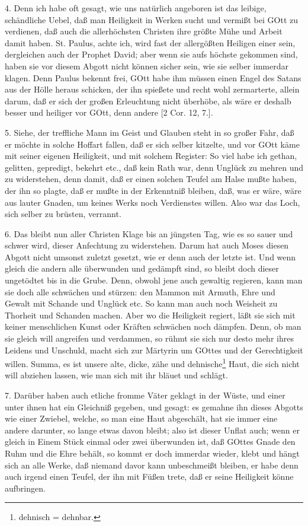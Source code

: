 4. Denn ich habe oft gesagt, wie uns natürlich angeboren ist das leibige, schändliche Uebel, daß man Heiligkeit in Werken sucht und vermißt bei GOtt zu verdienen, daß auch die allerhöchsten Christen ihre größte Mühe und Arbeit damit haben. St. Paulus, achte ich, wird fast der allergößten Heiligen einer sein, dergleichen auch der Prophet David; aber wenn sie aufs höchste gekommen sind, haben sie vor diesem Abgott nicht können sicher sein, wie sie selber immerdar klagen. Denn Paulus bekennt frei, GOtt habe ihm müssen einen Engel des Satans aus der Hölle heraus schicken, der ihn spießete und recht wohl zermarterte, allein darum, daß er sich der großen Erleuchtung nicht überhöbe, als wäre er deshalb besser und heiliger vor GOtt, denn andere [2 Cor. 12, 7.].

5. Siehe, der treffliche Mann im Geist und Glauben steht in so großer Fahr, daß er möchte in solche Hoffart fallen, daß er sich selber kitzelte, und vor GOtt käme mit seiner eigenen Heiligkeit, und mit solchem Register: So viel habe ich gethan, gelitten, gepredigt, bekehrt etc., daß kein Rath war, denn Unglück zu mehren und zu widerstehen, denn damit, daß er einen solchen Teufel am Halse mußte haben, der ihn so plagte, daß er mußte in der Erkenntniß bleiben, daß, was er wäre, wäre aus lauter Gnaden, um keines Werks noch Verdienstes willen. Also war das Loch, sich selber zu brüsten, verrannt.

6. Das bleibt nun aller Christen Klage bis an jüngsten Tag, wie es so sauer und schwer wird, dieser Anfechtung zu widerstehen. Darum hat auch Moses diesen Abgott nicht umsonst zuletzt gesetzt, wie er denn auch der letzte ist. Und wenn gleich die andern alle überwunden und gedämpft sind, so bleibt doch dieser ungetödtet bis in die Grube. Denn, obwohl jene auch gewaltig regieren, kann man sie doch alle schwächen und stürzen: den Mammon mit Armuth, Ehre und Gewalt mit Schande und Unglück etc. So kann man auch noch Weisheit zu Thorheit und Schanden machen. Aber wo die Heiligkeit regiert, läßt sie sich mit keiner menschlichen Kunst oder Kräften schwächen noch dämpfen. Denn, ob man sie gleich will angreifen und verdammen, so rühmt sie sich nur desto mehr ihres Leidens
und Unschuld, macht sich zur Märtyrin um GOttes und der Gerechtigkeit willen. Summa, es ist unsere alte, dicke, zähe und dehnische\footnote{dehnisch = dehnbar.} Haut, die sich nicht will abziehen lassen, wie man sich mit ihr bläuet und schlägt.

7. Darüber haben auch etliche fromme Väter geklagt in der Wüste, und einer unter ihnen hat ein Gleichniß gegeben, und gesagt: es gemahne ihn dieses Abgotts wie einer Zwiebel, welche, so man eine Haut abgeschält, hat sie immer eine andere darunter, so lange etwas davon bleibt; also ist dieser Unflat auch; wenn er gleich in Einem Stück einmal oder zwei überwunden ist, daß GOttes Gnade den Ruhm und die Ehre behält, so kommt er doch immerdar wieder, klebt und hängt sich an alle Werke, daß niemand davor kann unbeschmeißt bleiben, er habe denn auch irgend einen Teufel, der ihn mit Füßen trete, daß er seine Heiligkeit könne aufbringen.


